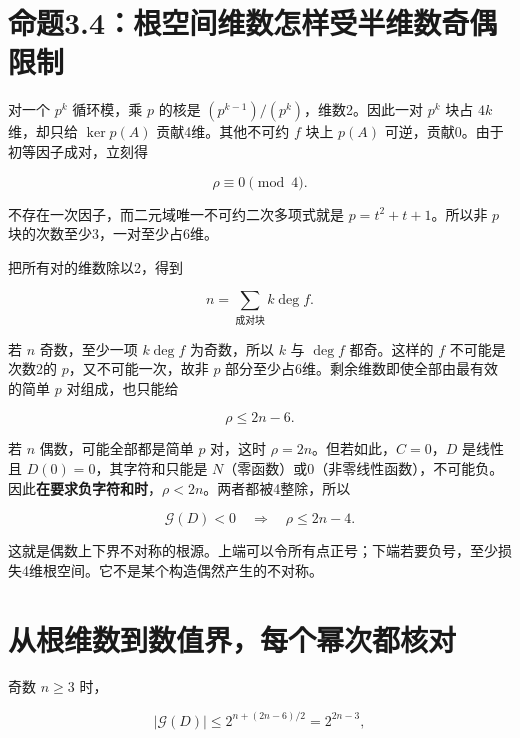\documentclass[UTF8,fontset=fandol,zihao=-4,openany,oneside]{ctexbook}
\begin{document}
\section{命题3.4：根空间维数怎样受半维数奇偶限制}


对一个 \(p^k\) 循环模，乘 \(p\) 的核是 \((p^{k-1})/(p^k)\)，维数2。因此一对 \(p^k\) 块占 \(4k\) 维，却只给 \(\ker p(A)\) 贡献4维。其他不可约 \(f\) 块上 \(p(A)\) 可逆，贡献0。由于初等因子成对，立刻得



\[
\rho\equiv0\pmod4.
\]



不存在一次因子，而二元域唯一不可约二次多项式就是 \(p=t^2+t+1\)。所以非 \(p\) 块的次数至少3，一对至少占6维。



把所有对的维数除以2，得到



\[
n=\sum_{\text{成对块}} k\deg f.
\]



若 \(n\) 奇数，至少一项 \(k\deg f\) 为奇数，所以 \(k\) 与 \(\deg f\) 都奇。这样的 \(f\) 不可能是次数2的 \(p\)，又不可能一次，故非 \(p\) 部分至少占6维。剩余维数即使全部由最有效的简单 \(p\) 对组成，也只能给



\[
\rho\le2n-6.
\]



若 \(n\) 偶数，可能全部都是简单 \(p\) 对，这时 \(\rho=2n\)。但若如此，\(C=0\)，\(D\) 是线性且 \(D(0)=0\)，其字符和只能是 \(N\)（零函数）或0（非零线性函数），不可能负。因此\textbf{在要求负字符和时}，\(\rho<2n\)。两者都被4整除，所以



\[
\mathcal G(D)<0\quad\Longrightarrow\quad\rho\le2n-4.
\]



这就是偶数上下界不对称的根源。上端可以令所有点正号；下端若要负号，至少损失4维根空间。它不是某个构造偶然产生的不对称。



\section{从根维数到数值界，每个幂次都核对}


奇数 \(n\ge3\) 时，



\[
|\mathcal G(D)|\le2^{n+(2n-6)/2}=2^{2n-3},
\]
\end{document}
